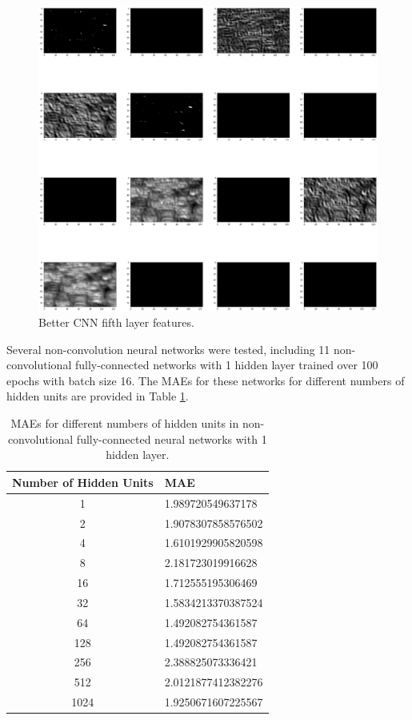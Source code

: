 \documentclass[12pt, oneside]{article}   	%
\begin{document}
\begin{figure}%
\includegraphics[width=\textwidth]{better_cnn_fifth_layer}
\caption{\label{fig:better_cnn_fifth_layer}Better CNN fifth layer features.}
\end{figure}

Several non-convolution neural networks were tested, including 11 non-convolutional fully-connected networks with 1 hidden layer trained over 100 epochs with batch size 16. The MAEs for these networks for different numbers of hidden units are provided in Table \ref{table:fcnn_maes}.

\begin{table}
\begin{center}\begin{tabular}{c|l}
\textbf{Number of Hidden Units} & \textbf{MAE} \\ \hline
1 & 1.989720549637178 \\
2 & 1.9078307858576502 \\
4 & 1.6101929905820598 \\
8 & 2.181723019916628 \\
16 & 1.712555195306469 \\
32 & 1.5834213370387524 \\
64 & 1.492082754361587 \\
128 & 1.492082754361587 \\
256 & 2.388825073336421 \\
512 & 2.0121877412382276 \\
1024 & 1.9250671607225567 \\
\end{tabular}\end{center}
\caption{\label{table:fcnn_maes}MAEs for different numbers of hidden units in non-convolutional fully-connected neural networks with 1 hidden layer.}
\end{table} 
\end{document}
